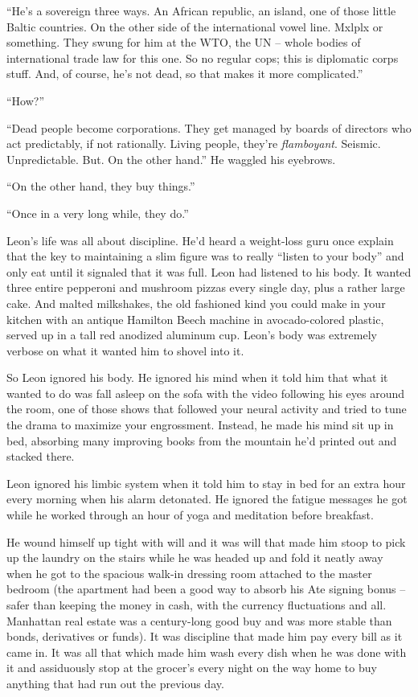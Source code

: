 “He's a sovereign three ways. An African republic, an island, one of 
those little Baltic countries. On the other side of the international 
vowel line. Mxlplx or something. They swung for him at the WTO, the UN 
-- whole bodies of international trade law for this one. So no regular 
cops; this is diplomatic corps stuff. And, of course, he's not dead, so 
that makes it more complicated.”

“How?”

“Dead people become corporations. They get managed by boards of 
directors who act predictably, if not rationally. Living people, 
they're \emph{flamboyant}. Seismic. Unpredictable. But. On the other 
hand.” He waggled his eyebrows.

“On the other hand, they buy things.”

“Once in a very long while, they do.”

\tb

Leon's life was all about discipline. He'd heard a weight-loss guru 
once explain that the key to maintaining a slim figure was to really 
“listen to your body” and only eat until it signaled that it was 
full. Leon had listened to his body. It wanted three entire pepperoni 
and mushroom pizzas every single day, plus a rather large cake. And 
malted milkshakes, the old fashioned kind you could make in your 
kitchen with an antique Hamilton Beech machine in avocado-colored 
plastic, served up in a tall red anodized aluminum cup. Leon's body was 
extremely verbose on what it wanted him to shovel into it.

So Leon ignored his body. He ignored his mind when it told him that 
what it wanted to do was fall asleep on the sofa with the video 
following his eyes around the room, one of those shows that followed 
your neural activity and tried to tune the drama to maximize your 
engrossment. Instead, he made his mind sit up in bed, absorbing many 
improving books from the mountain he'd printed out and stacked there.

Leon ignored his limbic system when it told him to stay in bed for an 
extra hour every morning when his alarm detonated. He ignored the 
fatigue messages he got while he worked through an hour of yoga and 
meditation before breakfast.

He wound himself up tight with will and it was will that made him stoop 
to pick up the laundry on the stairs while he was headed up and fold it 
neatly away when he got to the spacious walk-in dressing room attached 
to the master bedroom (the apartment had been a good way to absorb his 
Ate signing bonus -- safer than keeping the money in cash, with the 
currency fluctuations and all. Manhattan real estate was a century-long 
good buy and was more stable than bonds, derivatives or funds). It was 
discipline that made him pay every bill as it came in. It was all that 
which made him wash every dish when he was done with it and assiduously 
stop at the grocer's every night on the way home to buy anything that 
had run out the previous day.


